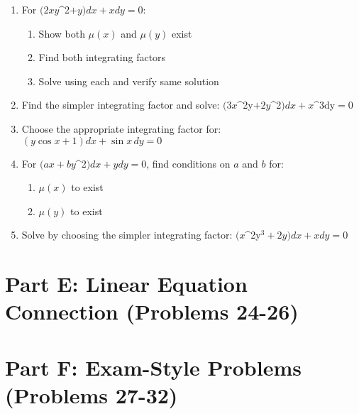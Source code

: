 \documentclass[12pt]{article}
\begin{document}
\begin{enumerate}[start=19]
\item For $(2xy$^{2}$ + y)dx + xdy = 0$:
\begin{enumerate}[label=(\alph*)]
    \item Show both $\mu(x)$ and $\mu(y)$ exist
    \item Find both integrating factors
    \item Solve using each and verify same solution
\end{enumerate}

\item Find the simpler integrating factor and solve:
$(3x$^{2y}$ + 2y$^{2}$)dx + x$^{3dy}$ = 0$

\item Choose the appropriate integrating factor for:
$(y\cos x + 1)dx + \sin x\,dy = 0$

\item For $(ax + by$^{2}$)dx + ydy = 0$, find conditions on $a$ and $b$ for:
\begin{enumerate}[label=(\alph*)]
    \item $\mu(x)$ to exist
    \item $\mu(y)$ to exist
\end{enumerate}

\item Solve by choosing the simpler integrating factor:
$(x$^{2y}$^3 + 2y)dx + xdy = 0$
\end{enumerate}

\section*{Part E: Linear Equation Connection (Problems 24-26)}


\section*{Part F: Exam-Style Problems (Problems 27-32)}
\end{document}

